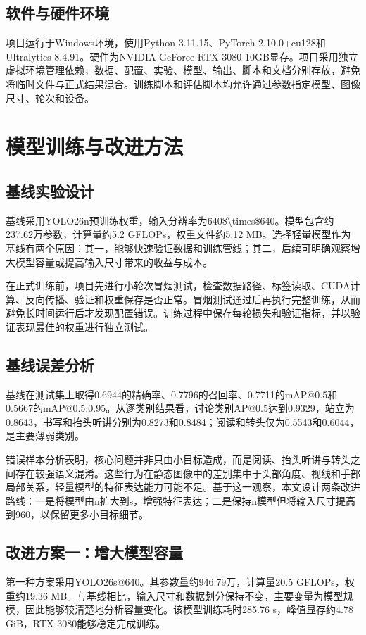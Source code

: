 \documentclass[12pt,hyperref,a4paper,UTF8]{ctexart}
\begin{document}
\subsection{软件与硬件环境}
项目运行于Windows环境，使用Python 3.11.15、PyTorch 2.10.0+cu128和Ultralytics 8.4.91。硬件为NVIDIA GeForce RTX 3080 10GB显存。项目采用独立虚拟环境管理依赖，数据、配置、实验、模型、输出、脚本和文档分别存放，避免将临时文件与正式结果混合。训练脚本和评估脚本均允许通过参数指定模型、图像尺寸、轮次和设备。\par
\section{模型训练与改进方法}
\subsection{基线实验设计}
基线采用YOLO26n预训练权重，输入分辨率为640\$\textbackslash{}times\$640。模型包含约237.62万参数，计算量约5.2 GFLOPs，权重文件约5.12 MB。选择轻量模型作为基线有两个原因：其一，能够快速验证数据和训练管线；其二，后续可明确观察增大模型容量或提高输入尺寸带来的收益与成本。\par
在正式训练前，项目先进行小轮次冒烟测试，检查数据路径、标签读取、CUDA计算、反向传播、验证和权重保存是否正常。冒烟测试通过后再执行完整训练，从而避免长时间运行后才发现配置错误。训练过程中保存每轮损失和验证指标，并以验证表现最佳的权重进行独立测试。\par
\subsection{基线误差分析}
基线在测试集上取得0.6944的精确率、0.7796的召回率、0.7711的mAP@0.5和0.5667的mAP@0.5:0.95。从逐类别结果看，讨论类别AP@0.5达到0.9329，站立为0.8643，书写和抬头听讲分别为0.8273和0.8484；阅读和转头仅为0.5543和0.6044，是主要薄弱类别。\par
错误样本分析表明，核心问题并非只由小目标造成，而是阅读、抬头听讲与转头之间存在较强语义混淆。这些行为在静态图像中的差别集中于头部角度、视线和手部局部关系，轻量模型的特征表达能力可能不足。基于这一观察，本文设计两条改进路线：一是将模型由n扩大到s，增强特征表达；二是保持n模型但将输入尺寸提高到960，以保留更多小目标细节。\par
\subsection{改进方案一：增大模型容量}
第一种方案采用YOLO26s@640。其参数量约946.79万，计算量20.5 GFLOPs，权重约19.36 MB。与基线相比，输入尺寸和数据划分保持不变，主要变量为模型规模，因此能够较清楚地分析容量变化。该模型训练耗时285.76 s，峰值显存约4.78 GiB，RTX 3080能够稳定完成训练。\par
\end{document}

